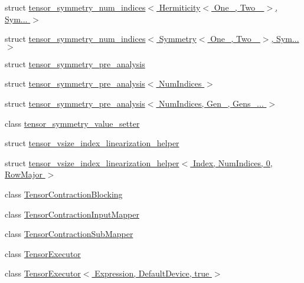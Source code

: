 \begin{DoxyCompactItemize}
\item 
struct \hyperlink{struct_eigen_1_1internal_1_1tensor__symmetry__num__indices_3_01_hermiticity_3_01_one___00_01_two___01_4_00_01_sym_8_8_8_01_4}{tensor\+\_\+symmetry\+\_\+num\+\_\+indices$<$ Hermiticity$<$ One\+\_\+, Two\+\_\+ $>$, Sym... $>$}
\item 
struct \hyperlink{struct_eigen_1_1internal_1_1tensor__symmetry__num__indices_3_01_symmetry_3_01_one___00_01_two___01_4_00_01_sym_8_8_8_01_4}{tensor\+\_\+symmetry\+\_\+num\+\_\+indices$<$ Symmetry$<$ One\+\_\+, Two\+\_\+ $>$, Sym... $>$}
\item 
struct \hyperlink{struct_eigen_1_1internal_1_1tensor__symmetry__pre__analysis}{tensor\+\_\+symmetry\+\_\+pre\+\_\+analysis}
\item 
struct \hyperlink{struct_eigen_1_1internal_1_1tensor__symmetry__pre__analysis_3_01_num_indices_01_4}{tensor\+\_\+symmetry\+\_\+pre\+\_\+analysis$<$ Num\+Indices $>$}
\item 
struct \hyperlink{struct_eigen_1_1internal_1_1tensor__symmetry__pre__analysis_3_01_num_indices_00_01_gen___00_01_gens___8_8_8_01_4}{tensor\+\_\+symmetry\+\_\+pre\+\_\+analysis$<$ Num\+Indices, Gen\+\_\+, Gens\+\_\+... $>$}
\item 
class \hyperlink{class_eigen_1_1internal_1_1tensor__symmetry__value__setter}{tensor\+\_\+symmetry\+\_\+value\+\_\+setter}
\item 
struct \hyperlink{struct_eigen_1_1internal_1_1tensor__vsize__index__linearization__helper}{tensor\+\_\+vsize\+\_\+index\+\_\+linearization\+\_\+helper}
\item 
struct \hyperlink{struct_eigen_1_1internal_1_1tensor__vsize__index__linearization__helper_3_01_index_00_01_num_ind9177d0103e87c6e554ba6030344a88bc}{tensor\+\_\+vsize\+\_\+index\+\_\+linearization\+\_\+helper$<$ Index, Num\+Indices, 0, Row\+Major $>$}
\item 
class \hyperlink{class_eigen_1_1internal_1_1_tensor_contraction_blocking}{Tensor\+Contraction\+Blocking}
\item 
class \hyperlink{class_eigen_1_1internal_1_1_tensor_contraction_input_mapper}{Tensor\+Contraction\+Input\+Mapper}
\item 
class \hyperlink{class_eigen_1_1internal_1_1_tensor_contraction_sub_mapper}{Tensor\+Contraction\+Sub\+Mapper}
\item 
class \hyperlink{class_eigen_1_1internal_1_1_tensor_executor}{Tensor\+Executor}
\item 
class \hyperlink{class_eigen_1_1internal_1_1_tensor_executor_3_01_expression_00_01_default_device_00_01true_01_4}{Tensor\+Executor$<$ Expression, Default\+Device, true $>$}

\end{DoxyCompactItemize}
